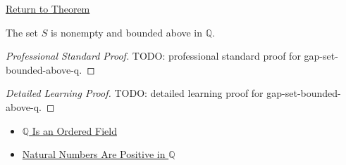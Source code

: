 \newpage
{}
\label{prf:gap-set-bounded-above-q}

\begin{remark*}[Return]
\hyperref[prop:gap-set-bounded-above-q]{Return to Theorem}
\end{remark*}

\begin{proposition*}
The set $S$ is nonempty and bounded above in $\mathbb{Q}$.
\end{proposition*}

\begin{proof}[Professional Standard Proof]
\LRAProofBodyStart
TODO: professional standard proof for gap-set-bounded-above-q.
\end{proof}

\begin{proof}[Detailed Learning Proof]
\LRAProofBodyStart
TODO: detailed learning proof for gap-set-bounded-above-q.
\end{proof}

\begin{remark*}
\end{remark*}

\begin{dependencies}
\begin{itemize}
  \item \hyperref[thm:q-is-an-ordered-field]{$\mathbb{Q}$ Is an Ordered Field}
  \item \hyperref[cor:natural-numbers-positive-on-q]{Natural Numbers Are Positive in $\mathbb{Q}$}
\end{itemize}
\end{dependencies}

\clearpage

